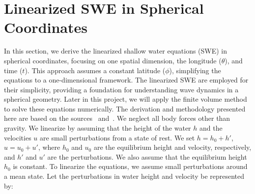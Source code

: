 



\section{Linearized SWE in Spherical Coordinates}
In this section, we derive the linearized shallow water equations (SWE) in spherical coordinates, focusing on one spatial dimension, the longitude ($\theta$), and time ($t$).
This approach assumes a constant latitude ($\phi$), simplifying the equations to a one-dimensional framework.
The linearized SWE are employed for their simplicity, providing a foundation for understanding wave dynamics in a spherical geometry.
Later in this project, we will apply the finite volume method to solve these equations numerically.
The derivation and methodology presented here are based on the sources~\cite{BONEV_2018} and~\cite{Eskilsson_2005}.
We neglect all body forces other than gravity.
We linearize by assuming that the height of the water $h$ and the velocities $u$ are small perturbations from a state of rest.
We set $h = h_0 + h'$, $u = u_0 + u'$, where $h_0$ and $u_0$ are the equilibrium height and velocity, respectively, and $h'$ and $u'$ are the perturbations.
We also assume that the equilibrium height $h_0$ is constant.
To linearize the equations, we assume small perturbations around a mean state. Let the perturbations in water height and velocity be represented by:

